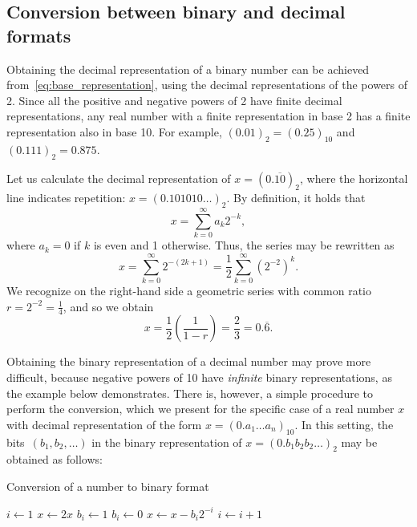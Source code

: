 \subsection{Conversion between binary and decimal formats}%
Obtaining the decimal representation of a binary number can be achieved from~\eqref{eq:base_representation},
using the decimal representations of the powers of 2.
Since all the positive and negative powers of 2 have finite decimal representations,
any real number with a finite representation in base 2 has a finite representation also in base 10.
For example, $(0.01)_2 = (0.25)_{10}$ and $(0.111)_2 = 0.875$.
\begin{example}
    \label{example:converting_binary_to_decimal}
    Let us calculate the decimal representation of $x = (0.\overline{10})_2$,
    where the horizontal line indicates repetition: $x = (0.101010\dots)_2$.
    By definition, it holds that
    \[
        x = \sum_{k=0}^{\infty} a_k 2^{-k},
    \]
    where $a_k = 0$ if $k$ is even and 1 otherwise.
    Thus, the series may be rewritten as
    \[
        x = \sum_{k=0}^{\infty} 2^{-(2k+1)} = \frac{1}{2} \sum_{k=0}^{\infty} (2^{-2})^k.
    \]
    We recognize on the right-hand side a geometric series with common ratio $r = 2^{-2} = \frac{1}{4}$,
    and so we obtain
    \[
        x = \frac{1}{2} \left( \frac{1}{1-r} \right) = \frac{2}{3} = 0.\overline 6.
    \]
\end{example}

Obtaining the binary representation of a decimal number may prove more difficult,
because negative powers of 10 have \emph{infinite} binary representations,
as the example below demonstrates.
There is, however, a simple procedure to perform the conversion,
which we present for the specific case of a real number $x$ with decimal representation of the form $x = (0.a_1\dots a_n)_{10}$.
In this setting,
the bits~$(b_1, b_2, \dots)$ in the binary representation of $x = (0.b_1b_2b_2 \dots)_2$ may be obtained as follows:
\begin{algorithm}
\caption{Conversion of a number to binary format}%
\label{algo:conversion_to_binary}%
\begin{algorithmic}[1]
\State $i \gets 1$
    \State $x \gets 2x$%
    \label{line:after_while}
        \State $b_i \gets 1$
    \Else
        \State $b_i \gets 0$
    \EndIf
    \State $x \gets x - b_i 2^{-i}$
    \State $i \gets i+1$
\EndWhile
\end{algorithmic}
\end{algorithm}

